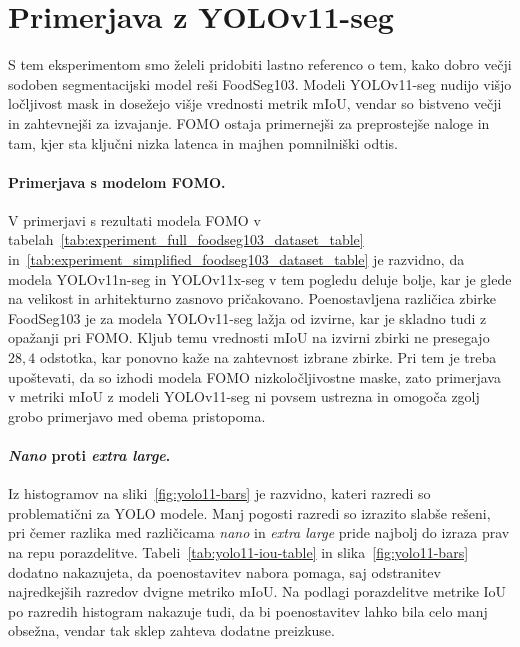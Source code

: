 \documentclass[a4paper,twoside,openright,12pt,slovene]{book}
\begin{document}
    \section{Primerjava z YOLOv11-seg}
        
        S tem eksperimentom smo želeli pridobiti lastno referenco o tem, kako dobro večji sodoben segmentacijski model reši FoodSeg103.
        Modeli YOLOv11-seg nudijo višjo ločljivost mask in dosežejo višje vrednosti metrik mIoU, vendar so bistveno večji in zahtevnejši za izvajanje. FOMO ostaja primernejši za preprostejše naloge in tam, kjer sta ključni nizka latenca in majhen pomnilniški odtis.

        \paragraph{Primerjava s modelom FOMO.}
        V primerjavi s rezultati modela FOMO v
        tabelah~\ref{tab:experiment_full_foodseg103_dataset_table}
        in~\ref{tab:experiment_simplified_foodseg103_dataset_table}
        je razvidno, da modela YOLOv11n-seg in YOLOv11x-seg v tem
        pogledu deluje bolje, kar je glede na velikost in arhitekturno zasnovo
        pričakovano. Poenostavljena različica zbirke FoodSeg103 je za modela YOLOv11-seg
        lažja od izvirne, kar je skladno tudi z opažanji pri FOMO. Kljub temu
        vrednosti mIoU na izvirni zbirki ne presegajo $28{,}4$ odstotka, kar
        ponovno kaže na zahtevnost izbrane zbirke.
        Pri tem je treba upoštevati, da so izhodi modela FOMO nizkoločljivostne
        maske,
        zato primerjava v metriki mIoU z modeli YOLOv11-seg ni povsem ustrezna in omogoča zgolj grobo primerjavo med obema pristopoma.
        
        \paragraph{\emph{Nano} proti \emph{extra large}.}
        Iz histogramov na sliki~\ref{fig:yolo11-bars}
        je razvidno, kateri razredi so problematični za YOLO modele. Manj pogosti
        razredi so izrazito slabše rešeni, pri čemer razlika med različicama
        \emph{nano} in \emph{extra large} pride najbolj do izraza prav na repu
        porazdelitve. Tabeli~\ref{tab:yolo11-iou-table}
        in slika~\ref{fig:yolo11-bars}
        dodatno nakazujeta, da poenostavitev nabora pomaga, saj odstranitev
        najredkejših razredov dvigne metriko mIoU. Na podlagi porazdelitve
        metrike IoU po razredih histogram nakazuje tudi, da bi poenostavitev
        lahko bila celo manj obsežna, vendar tak sklep zahteva dodatne
        preizkuse.
        
\end{document}
